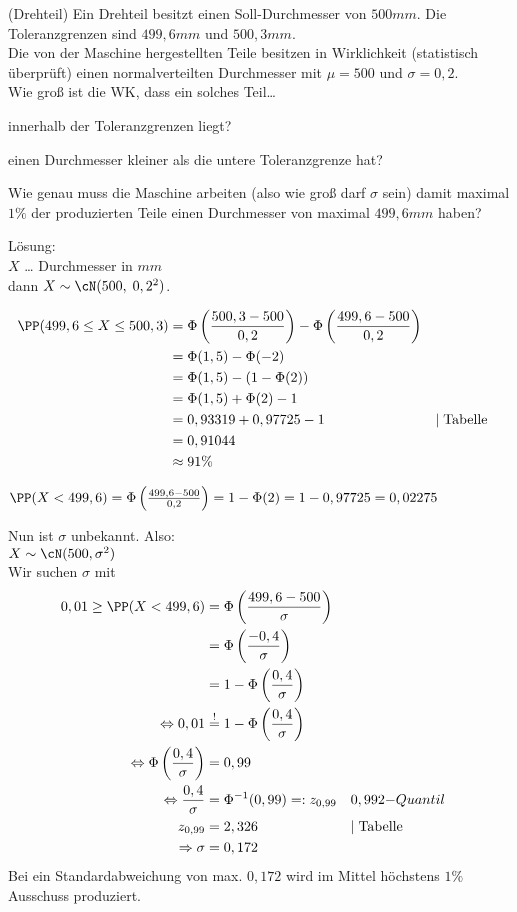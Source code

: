  (Drehteil) Ein Drehteil besitzt einen Soll-Durchmesser von $500\unit{mm}$. Die Toleranzgrenzen sind $499,6\unit{mm}$ und $500,3 \unit{mm}$.\\
Die von der Maschine hergestellten Teile besitzen in Wirklichkeit (statistisch überprüft) einen normalverteilten Durchmesser mit $\mu=500$ und $\sigma = 0,2$.\\
Wie groß ist die WK, dass ein solches Teil…
\begin{anumerate}
\item innerhalb der Toleranzgrenzen liegt?
\item einen Durchmesser kleiner als die untere Toleranzgrenze hat?
\item Wie genau muss die Maschine arbeiten (also wie groß darf $\sigma$ sein) damit maximal $1\%$ der produzierten Teile einen Durchmesser von maximal $499,6\unit{mm}$ haben?
\end{anumerate}
Lösung:\\
$X$ … Durchmesser in $\unit{mm}$\\
dann $X \sim \cN(500,\; 0,2^2)$.
\begin{anumerate}
\item 
\begin{align*}
\PP(499,6 \leq X \leq 500,3)&=\Phi \left(\frac{500,3-500}{0,2}\right)-\Phi \left(\frac{499,6-500}{0,2}\right)\\
&=\Phi(1,5)-\Phi(-2)\\
&= \Phi (1,5)-(1-\Phi(2))\\
&= \Phi(1,5)+\Phi(2)-1\\
&= 0,93319+0,97725-1 &&|\;\mathrm{Tabelle}\\
&= 0,91044\\
&\approx 91\%
\end{align*}
\item $\PP(X<499,6) = \Phi\left(\frac{499,6-500}{0,2}\right) = 1-\Phi(2)=1-0,97725=0,02275$
\item Nun ist $\sigma$ unbekannt. Also:\\
$X\sim \cN(500, \sigma^2)$\\
Wir suchen $\sigma$ mit 
\begin{align*}
0,01\geq\PP(X<499,6) &= \Phi\left(\frac{499,6-500}{\sigma}\right)\\
&=\Phi\left(\frac{-0,4}{\sigma}\right)\\
&=1-\Phi\left(\frac{0,4}{\sigma}\right)\\
\Leftrightarrow 0,01 &\overset{!}{=}1-\Phi\left(\frac{0,4}{\sigma}\right)\\
\Leftrightarrow \Phi\left(\frac{0,4}{\sigma}\right) &= 0,99\\
\Leftrightarrow \frac{0,4}{\sigma}&=\Phi^{-1}(0,99) =:z_{0,99} && 0,99\mathrm2{-Quantil}\\
z_{0,99}&=2,326 && |\; \mathrm{Tabelle}\\
\Rightarrow \sigma &=0,172
\end{align*}
Bei ein Standardabweichung von max. $0,172$ wird im Mittel höchstens $1\%$ Ausschuss produziert.
\end{anumerate}


